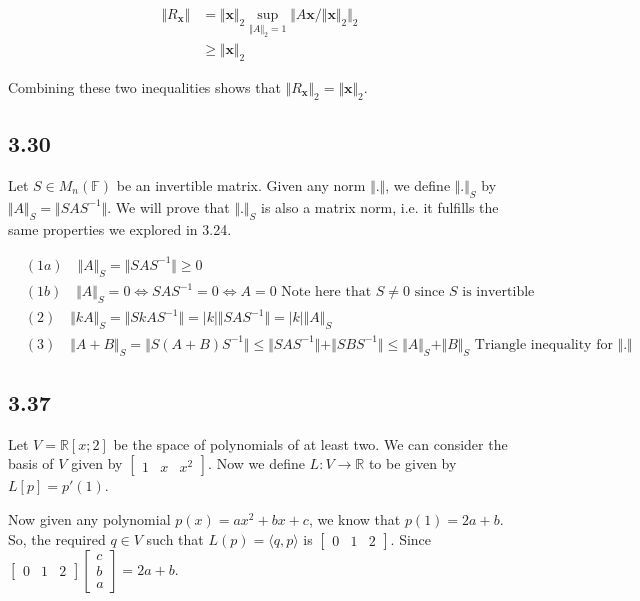 \documentclass{article}
\newcommand{\inprod}[1]{\langle #1 \rangle}
\begin{document}
	\begin{align*}
	\Vert R_\mathbf{x} \Vert &= \Vert \mathbf{x} \Vert_2 \sup_{\Vert A \Vert_2 = 1} \Vert A \mathbf{x} / \Vert \mathbf{x} \Vert_2 \Vert_2  \\
	&\geq \Vert \mathbf{x} \Vert_2
	\end{align*}
	
	Combining these two inequalities shows that $ \Vert R_\mathbf{x} \Vert_2 = \Vert \mathbf{x} \Vert_2$.
	
	\subsection*{3.30}
	Let $S \in M_n(\mathbb{F})$ be an invertible matrix. Given any norm $\Vert  . \Vert$, we define $\Vert . \Vert_S$ by $\Vert A \Vert_S = \Vert S A S^{-1} \Vert$. We will prove that $\Vert. \Vert_S$ is also a matrix norm, i.e. it fulfills the same properties we explored in 3.24.
	
	\begin{align*}
	&(1a) \quad \Vert A \Vert_S = \Vert S A S^{-1} \Vert \geq 0 \\
	&(1b) \quad \Vert A \Vert_S = 0 \iff S A S^{-1} = 0 \iff A = 0 \text{ Note here that $S \neq 0$ since $S$ is invertible} \\
	&(2) \quad \Vert k A \Vert_S = \Vert S k A S^{-1} \Vert = |k| \Vert S A S^{-1} \Vert = |k| \Vert A \Vert_S \\
	&(3) \quad \Vert A + B \Vert_S = \Vert S (A + B) S^{-1} \Vert \leq \Vert S A S^{-1} \Vert + \Vert S B S^{-1} \Vert  \leq \Vert A \Vert_S + \Vert B \Vert_S \text{ Triangle inequality for $\Vert . \Vert$} 
	\end{align*}
	
	\subsection*{3.37}
	Let $V = \mathbb{R}[x;2]$ be the space of polynomials of at least two. We can consider the basis of $V$ given by $\begin{bmatrix} 1 & x & x^2\end{bmatrix}$. Now we define $L: V \to \mathbb{R}$ to be given by $L[p] = p'(1)$. 
	
	Now given any polynomial $p(x) = ax^2 + bx + c$, we know that $p(1) = 2a + b$. So, the required $q \in V$ such that $L(p) = \inprod{q,p}$ is $\begin{bmatrix} 0 & 1 & 2 \end{bmatrix}$. Since $\begin{bmatrix} 0 & 1 & 2 \end{bmatrix} \begin{bmatrix} c \\ b \\ a\end{bmatrix} = 2a + b$.
	
\end{document}
